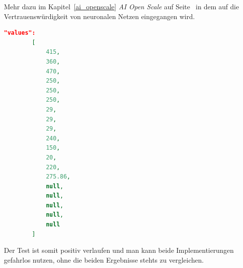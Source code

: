 Mehr dazu im Kapitel~\ref{ai_openscale} \textit{AI Open Scale} auf Seite~\pageref{ai_openscale} in dem auf die 
Vertrauenswürdigkeit von neuronalen Netzen eingegangen wird.

\begin{lstlisting}[language=JSON, caption=Parameter zum Test der beiden Implementierungen, label=ls:umsetzung_parameter]
    "values":
        [
            415,
            360,
            470,
            250,
            250,
            250,
            29,
            29,
            29,
            240,
            150,
            20,
            220,
            275.86,
            null,
            null,
            null,
            null,
            null
        ]
\end{lstlisting}

Der Test ist somit positiv verlaufen und man kann beide Implementierungen gefahrlos nutzen, ohne die beiden Ergebnisse
stehts zu vergleichen.